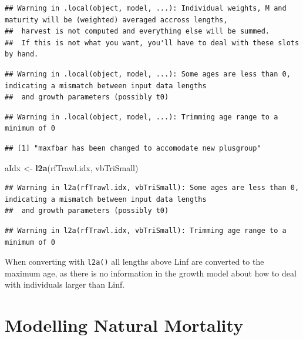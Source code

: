 \documentclass[
]{book}
\newenvironment{Shaded}{\begin{snugshade}}{\end{snugshade}}
\newcommand{\FunctionTok}[1]{\textcolor[rgb]{0.13,0.29,0.53}{\textbf{#1}}}
\newcommand{\NormalTok}[1]{#1}
\newcommand{\OtherTok}[1]{\textcolor[rgb]{0.56,0.35,0.01}{#1}}
\begin{document}
\begin{verbatim}
## Warning in .local(object, model, ...): Individual weights, M and maturity will be (weighted) averaged accross lengths,
##  harvest is not computed and everything else will be summed.
##  If this is not what you want, you'll have to deal with these slots by hand.
\end{verbatim}

\begin{verbatim}
## Warning in .local(object, model, ...): Some ages are less than 0, indicating a mismatch between input data lengths
##  and growth parameters (possibly t0)
\end{verbatim}

\begin{verbatim}
## Warning in .local(object, model, ...): Trimming age range to a minimum of 0
\end{verbatim}

\begin{verbatim}
## [1] "maxfbar has been changed to accomodate new plusgroup"
\end{verbatim}

\begin{Shaded}
\begin{Highlighting}[]
\NormalTok{aIdx }\OtherTok{\textless{}{-}} \FunctionTok{l2a}\NormalTok{(rfTrawl.idx, vbTriSmall)}
\end{Highlighting}
\end{Shaded}

\begin{verbatim}
## Warning in l2a(rfTrawl.idx, vbTriSmall): Some ages are less than 0, indicating a mismatch between input data lengths
##  and growth parameters (possibly t0)
\end{verbatim}

\begin{verbatim}
## Warning in l2a(rfTrawl.idx, vbTriSmall): Trimming age range to a minimum of 0
\end{verbatim}

When converting with \texttt{l2a()} all lengths above Linf are converted to the maximum age, as there is no information in the growth model about how to deal with individuals larger than Linf.

\hypertarget{modelling-natural-mortality}{%
\chapter{Modelling Natural Mortality}\label{modelling-natural-mortality}}
\end{document}
